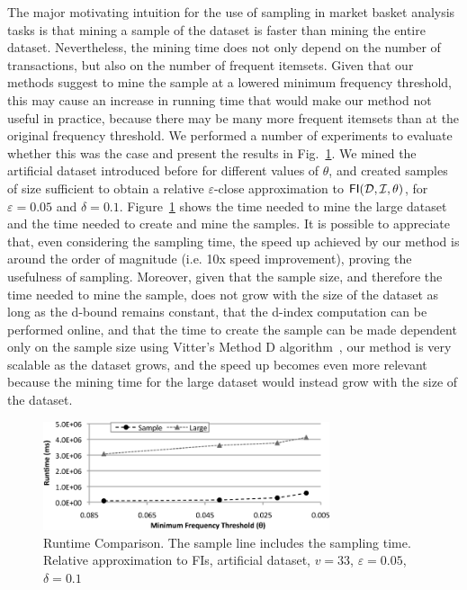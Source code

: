 The major motivating intuition for the use of sampling in market basket analysis
tasks is that mining a sample of the dataset is faster than mining the entire
dataset. Nevertheless, the mining time does not only depend on the number of
transactions, but also on the number of frequent itemsets. Given that our
methods suggest to mine the sample at a lowered minimum frequency threshold,
this may cause an increase in running time that would make our method not useful
in practice, because there may be many more frequent itemsets than at the
original frequency threshold. We performed a number of experiments to evaluate
whether this was the case and present the results in Fig.~\ref{fig:runtime}. 
We mined the artificial dataset introduced before for different values of $\theta$,
and created samples of size sufficient to obtain a relative $\varepsilon$-close
approximation to $\mathsf{FI}({\cal D},{\cal I},\theta)$, for $\varepsilon=0.05$ and
$\delta=0.1$. Figure~\ref{fig:runtime} shows the time needed to mine the large
dataset and the time needed to create and mine the samples. It is possible to
appreciate that, even considering the sampling time, the speed up achieved by
our method is around the order of magnitude (i.e. 10x speed improvement),
proving the usefulness of sampling. Moreover, given that the sample size, and
therefore the time needed to mine the sample, does not grow with the size of the
dataset as long as the d-bound remains constant, that the d-index computation
can be performed online, and that the time to create the sample can be made
dependent only on the sample size using Vitter's Method D
algorithm~\citep{Vitter87}, our method is very scalable as the dataset grows, and
the speed up becomes even more relevant because the mining time for the large
dataset would instead grow with the size of the dataset.

\begin{figure}[tp]
  \centering
  \includegraphics[width=0.75\textwidth]{vcmine/Fig4}
  \caption{Runtime Comparison. The sample line includes the sampling time.
  Relative approximation to FIs, artificial dataset, $v=33$, $\varepsilon=0.05$,
  $\delta=0.1$}
  \label{fig:runtime}
\end{figure}


